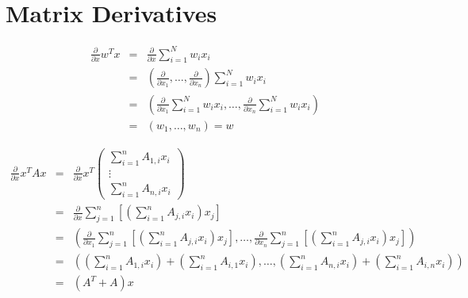 \section*{Matrix Derivatives}


\begin{eqnarray}
    \frac{\partial}{\partial x}w^Tx&=& \frac{\partial}{\partial x} \sum_{i=1}^N w_i x_i  \\
    &=&\left(\frac{\partial}{\partial x_1}, \dots, \frac{\partial}{\partial x_n} \right) \sum_{i=1}^N w_i x_i \\
    &=&\left(\frac{\partial}{\partial x_1}\sum_{i=1}^N w_i x_i , \dots, \frac{\partial}{\partial x_n} \sum_{i=1}^N w_i x_i \right) \\
    &=& (w_1,\dots,w_n) = w
\end{eqnarray}




\begin{eqnarray}
    \frac{\partial}{\partial x}x^TAx&=& \frac{\partial}{\partial x} x^T \left( 
    \begin{matrix}
      \sum_{i=1}^n A_{1,i} x_i\\ 
      \vdots \\
      \sum_{i=1}^n A_{n,i} x_i 
    \end{matrix}\right) \\
    &=& \frac{\partial}{\partial x} \sum_{j=1}^n\left[ \left( \sum_{i=1}^nA_{j,i}x_i \right) x_j \right]\\
    &=& \left( \frac{\partial}{\partial x_1} \sum_{j=1}^n\left[ \left( \sum_{i=1}^nA_{j,i}x_i \right) x_j \right], \dots , 
    \frac{\partial}{\partial x_n} \sum_{j=1}^n\left[ \left( \sum_{i=1}^nA_{j,i}x_i \right) x_j \right] \right) \\
    &=&  \left( \left( \sum_{i=1}^n A_{1,i} x_i \right) + \left( \sum_{i=1}^n A_{i,1}x_i \right), \dots , \left( \sum_{i=1}^n A_{n,i} x_i \right) + \left( \sum_{i=1}^n A_{i,n}x_i \right) \right) \\
&=& \left ( A^T + A \right) x
\end{eqnarray}
